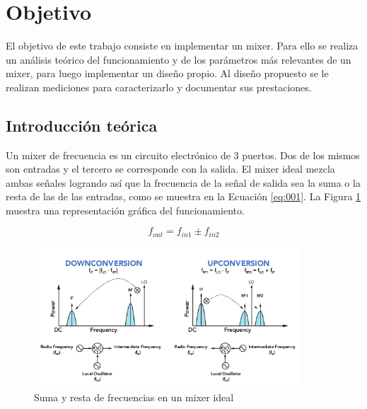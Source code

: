 \documentclass[a4paper,10pt]{article}
\title{  }
\begin{document}
	\maketitle %
	\newpage

	\tableofcontents %
	\newpage


\section{Objetivo}
\indent El objetivo de este trabajo consiste en implementar un mixer. Para ello 
se realiza un an\'alisis te\'orico del funcionamiento y de los par\'ametros 
m\'as relevantes de un mixer, para luego implementar un dise\~no propio. Al 
dise\~no propuesto se le realizan mediciones para caracterizarlo y documentar 
sus prestaciones.

\newpage
\subsection{Introducción teórica}
	\indent Un mixer de frecuencia es un circuito electrónico de 3 puertos. Dos
	de los mismos son entradas y el tercero se corresponde con la salida. El 
	mixer ideal mezcla ambas señales logrando así que la frecuencia de la señal 
	de salida sea la suma o la resta de las de las entradas, como se muestra en 
	la Ecuación \ref{eq:001}. La Figura \ref{img:001} muestra una representación
	gráfica del funcionamiento.
	
	\begin{equation}\label{eq:001}
		f_{out} = f_{in1} \pm f_{in2}
	\end{equation}

	\begin{figure}[!htb]
		\centering
		\includegraphics[width=10cm]
		{Images/MixerFunction.png}
		\caption{Suma y resta de frecuencias en un mixer ideal}
		\label{img:001} 
	\end{figure}
\end{document}
